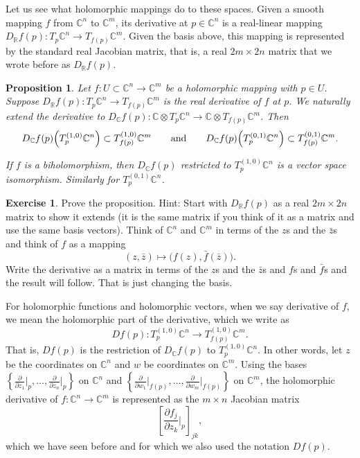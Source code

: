 \documentclass[12pt,openany]{book}
\newcommand{\C}{{\mathbb{C}}}
\newcommand{\R}{{\mathbb{R}}}
\theoremstyle{plain}
\newtheorem{prop}[thm]{Proposition}
\theoremstyle{remark}
\theoremstyle{definition}
\newenvironment{exbox}{%
    \def\FrameCommand{\vrule width 1pt \relax\hspace{10pt}}%
    \MakeFramed{\advance\hsize-\width\FrameRestore}%
}{%
    \endMakeFramed
}
\theoremstyle{exercise}
\newtheorem{exercise}{Exercise}[section]
\theoremstyle{example}
\begin{document}
Let us see what holomorphic mappings do to these spaces.  Given a smooth
mapping $f$ from $\C^n$ to $\C^m$, its derivative at $p \in \C^n$
is a real-linear mapping $D_\R f(p) \colon T_p\C^n \to T_{f(p)} \C^m$.
Given the basis above, this mapping is represented by
the standard real Jacobian matrix, that is, a real $2m \times 2n$ matrix
that we wrote before as $D_\R f(p)$.

\begin{prop} \label{prop:holvectmap}
Let $f \colon U \subset \C^n \to \C^m$ be a holomorphic mapping with
$p \in U$.
Suppose 
$D_\R f(p) \colon T_p\C^n \to T_{f(p)} \C^m$
is the real derivative of $f$ at $p$.
%
We naturally
extend the derivative to $D_\C f(p) \colon \C \otimes T_p\C^n \to \C \otimes  T_{f(p)}
\C^m$.  Then
\begin{equation*}
D_\C f(p)\Bigl(T_p^{(1,0)} \C^n\Bigr) \subset T_{f(p)}^{(1,0)} \C^m
\qquad \text{and} \qquad
D_\C f(p)\Bigl(T_p^{(0,1)} \C^n\Bigr) \subset T_{f(p)}^{(0,1)} \C^m .
\end{equation*}

If $f$ is a biholomorphism, then $D_\C f(p)$ restricted to $T_p^{(1,0)} \C^n$
is a vector space isomorphism.  Similarly for $T_p^{(0,1)} \C^n$.
\end{prop}

\begin{exbox}
\begin{exercise}
Prove the proposition.
Hint: Start with $D_\R f(p)$ as a real $2m \times 2n$ matrix to show it
extends (it is the same matrix if you think of it as a matrix
and use the same basis vectors).
Think of $\C^n$ and $\C^m$ in terms of the $z$s and the
$\bar{z}$s and think of $f$ as a mapping
\begin{equation*}
(z,\bar{z}) \mapsto \bigl( f(z) , \bar{f}(\bar{z}) \bigr) .
\end{equation*}
Write the derivative as a matrix in terms of the $z$s and the $\bar{z}$s
and $f$s and $\bar{f}$s and the result will follow.  That is just changing
the basis.
\end{exercise}
\end{exbox}

For holomorphic functions and holomorphic vectors,
when we say derivative of $f$, we mean the holomorphic part of the
derivative, which we write as
%
\begin{equation*}
D f(p) \colon T_p^{(1,0)} \C^n \to T_{f(p)}^{(1,0)} \C^m .
\end{equation*}
That is, $Df(p)$ is the restriction of $D_\C f(p)$ to $T_p^{(1,0)} \C^n$.
In other words, let $z$ be the coordinates on $\C^n$ and
$w$ be coordinates on $\C^m$.
Using the bases
$\left\{ \frac{\partial}{\partial z_1} \big|_p,\ldots,
\frac{\partial}{\partial z_n} \big|_p \right\}$
on $\C^n$ and 
$\left\{ \frac{\partial}{\partial w_1} \big|_{f(p)},\ldots,
\frac{\partial}{\partial w_m} \big|_{f(p)} \right\}$ on $\C^m$,
the holomorphic derivative of $f \colon \C^{n} \to \C^m$ is represented
as the $m \times n$ Jacobian matrix
\begin{equation*}
\left[
\frac{\partial f_j}{\partial z_k} \Big|_p
\right]_{jk} ,
\end{equation*}
which we have seen before and for which we also used the notation 
$Df(p)$.
\end{document}
